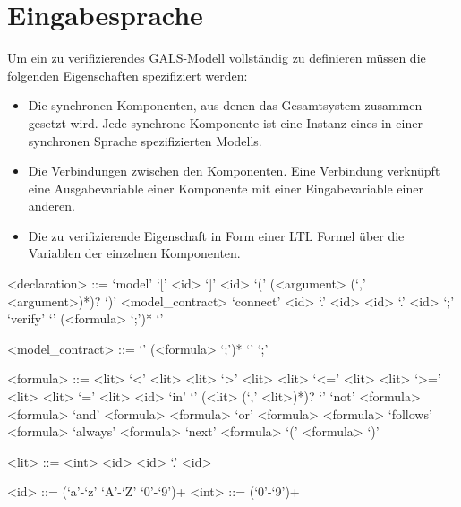 \section{Eingabesprache}
Um ein zu verifizierendes GALS-Modell vollständig zu definieren müssen die folgenden Eigenschaften spezifiziert werden:
\begin{itemize}
\item Die synchronen Komponenten, aus denen das Gesamtsystem zusammen gesetzt wird.
  Jede synchrone Komponente ist eine Instanz eines in einer synchronen Sprache spezifizierten Modells.
\item Die Verbindungen zwischen den Komponenten.
  Eine Verbindung verknüpft eine Ausgabevariable einer Komponente mit einer Eingabevariable einer anderen.
\item Die zu verifizierende Eigenschaft in Form einer LTL Formel über die Variablen der einzelnen Komponenten.
\end{itemize}

\begin{grammar}
  <declaration> ::= `model' `[' <id> `]' <id> `(' (<argument> (`,' <argument>)*)? `)' <model_contract>
  \alt `connect' <id> `.' <id> <id> `.' <id> `;'
  \alt `verify' `{' (<formula> `;')* `}'

  <model_contract> ::= `{' (<formula> `;')* `}'
  \alt `;'

  <formula> ::= <lit> `<' <lit>
  \alt <lit> `>' <lit>
  \alt <lit> `<=' <lit>
  \alt <lit> `>=' <lit>
  \alt <lit> `=' <lit>
  \alt <id> `in' `{' (<lit> (`,' <lit>)*)? `}'
  \alt `not' <formula>
  \alt <formula> `and' <formula>
  \alt <formula> `or' <formula>
  \alt <formula> `follows' <formula>
  \alt `always' <formula>
  \alt `next' <formula>
  \alt `(' <formula> `)'

  <lit> ::= <int>
  \alt <id>
  \alt <id> `.' <id>
  
  <id> ::= (`a'-`z' `A'-`Z' `0'-`9')+
  <int> ::= (`0'-`9')+
\end{grammar}
